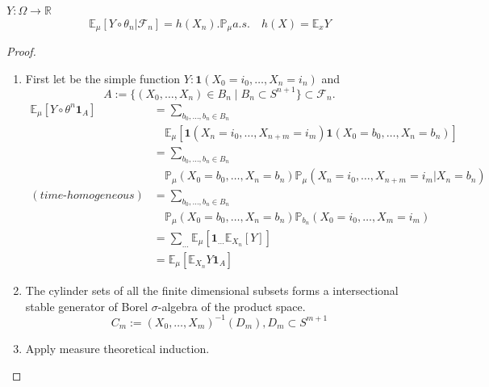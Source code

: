 \begin{theorem}
 $Y: \Omega \rightarrow \mathbb{R}$
 	\begin{equation*}
 		\mathbb{E}_\mu[Y \circ \theta_n|\mathcal{F}_n] = h(X_n).\mathbb{P}_\mu a.s. \quad h(X) = \mathbb{E}_x Y  
 	\end{equation*}
\end{theorem}
\begin{proof}\quad
 	\begin{enumerate}
	 		\item First let be the simple function $Y: \textbf{1}(X_0 = i_0, \dots, X_n = i_n)$ and
			\[
				A:= \{(X_0, \dots, X_n) \in B_n \mid B_n \subset S^{n+1}\} \subset \mathcal{F}_n .
			\]
	 		\begin{align*}
	 			\mathbb{E}_\mu[Y\circ \theta^n \textbf{1}_A]
			&= \sum_{b_0, \dots, b_n \in B_n}\\
			&\quad \mathbb{E}_\mu[\textbf{1}(X_n = i_0, \dots, X_{n+m} = i_m)
			\textbf{1}(X_0 = b_0, \dots, X_n = b_n)]\\
 			&= \sum_{b_0, \dots, b_n \in B_n}\\
			&\quad \mathbb{P}_\mu(X_0= b_0, \dots, X_n = b_n)
			\mathbb{P}_\mu(X_n = i_0, \dots, X_{n+m} = i_m|X_n = b_n)\\
 			(time\text{-}homogeneous)&= \sum_{b_0, \dots, b_n \in B_n}\\
			&\quad \mathbb{P}_\mu(X_0= b_0, \dots, X_n = b_n)
			\mathbb{P}_{b_n}(X_0 = i_0, \dots, X_{m} = i_m)\\
 			&= \sum_{\dots}\mathbb{E}_\mu[\textbf{1}_{\dots}\mathbb{E}_{X_n}[Y]]\\
 			&= \mathbb{E}_\mu[\mathbb{E}_{X_n}Y \textbf{1}_A]
 		\end{align*}
 		\item The cylinder sets of all the finite dimensional subsets forms a intersectional stable generator of Borel $\sigma$-algebra of the product space.
 		\begin{equation*}
 			C_m := (X_0, \dots, X_m)^{-1}(D_m), D_m \subset S^{m+1}
 		\end{equation*}
 		\item Apply measure theoretical induction.
 	\end{enumerate}
 \end{proof}
 

